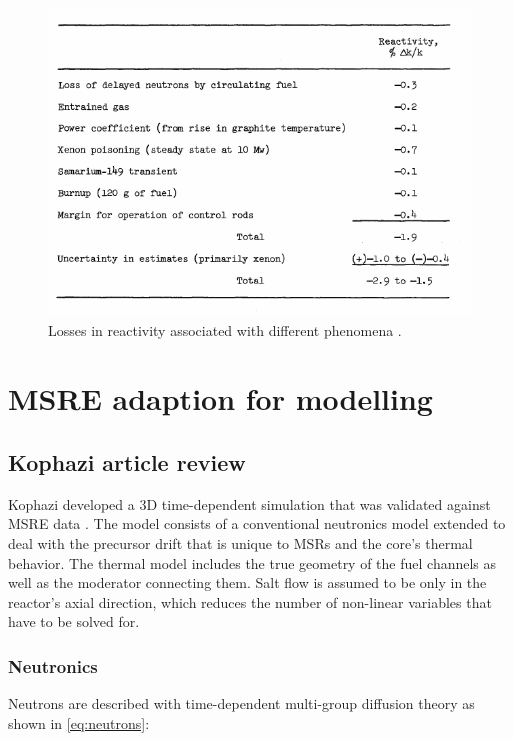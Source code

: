 \documentclass{article}
\let\Oldsection\section
\renewcommand{\section}{\FloatBarrier\Oldsection}
\let\Oldsubsection\subsection
\renewcommand{\subsection}{\FloatBarrier\Oldsubsection}
\let\Oldsubsubsection\subsubsection
\renewcommand{\subsubsection}{\FloatBarrier\Oldsubsubsection}
\begin{document}
\begin{figure}[htpb]
  \centering
  \includegraphics[max height=.5\textheight,max width=\textwidth,keepaspectratio]{reactivity-losses.png}
  \caption{Losses in reactivity associated with different
    phenomena \cite{robertson_msre_1965}.}
  \label{fig:reactivity_losses}
\end{figure}

\section{\gls{MSRE} adaption for modelling}

\subsection{Kophazi article review}

Kophazi developed a 3D time-dependent simulation that was validated against \gls{MSRE}
data \cite{kophazi_development_2009}. The model consists of a conventional
neutronics model extended to deal with the precursor drift that is unique to
MSRs and the core's thermal behavior. The thermal model includes the true
geometry of the fuel channels as well as the moderator connecting them. Salt
flow is assumed to be only in the reactor's axial direction, which reduces the
number of non-linear variables that have to be solved for.

\subsubsection{Neutronics}

Neutrons are described with time-dependent multi-group diffusion theory as shown
in \cref{eq:neutrons}:
\end{document}
